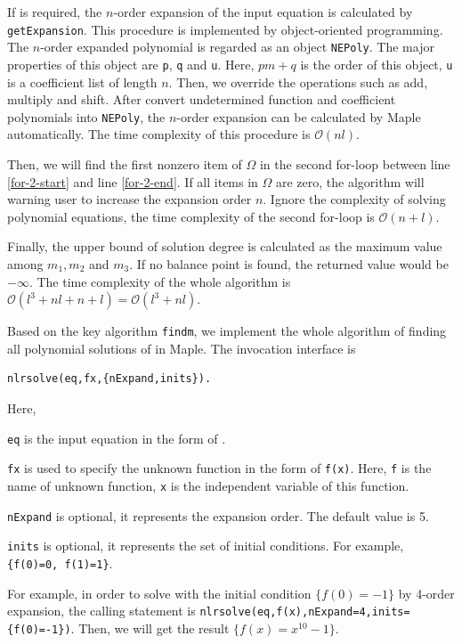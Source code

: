 If \BPthree{} is required, the $n$-order expansion of the input equation is calculated by \texttt{getExpansion}. This procedure is implemented by object-oriented programming. The $n$-order expanded polynomial is regarded as an object \texttt{NEPoly}. The major properties of this object are \texttt{p}, \texttt{q} and \texttt{u}. Here, $pm+q$ is the order of this object, \texttt{u} is a coefficient list of length $n$. Then, we override the operations such as add, multiply and shift. After convert undetermined function and coefficient polynomials into \texttt{NEPoly}, the $n$-order expansion can be calculated by Maple automatically. The time complexity of this procedure is $\mathcal O(nl)$.

Then, we will find the first nonzero item of $\Omega$ in the second for-loop between line \ref{for-2-start} and line \ref{for-2-end}. If all items in $\Omega$ are zero, the algorithm will warning user to increase the expansion order $n$. Ignore the complexity of solving polynomial equations, the time complexity of the second for-loop is $\mathcal O(n+l)$.

Finally, the upper bound of solution degree is calculated as the maximum value among $m_1,m_2$ and $m_3$. If no balance point is found, the returned value would be $-\infty$. The time complexity of the whole algorithm is $\mathcal O(l^3+nl+n+l)=\mathcal O(l^3+nl)$.

Based on the key algorithm \texttt{findm}, we implement the whole algorithm of finding all polynomial solutions of  in Maple. The invocation interface is
\begin{verbatim}
nlrsolve(eq,fx,{nExpand,inits}).
\end{verbatim}
Here,
\begin{compactitem}[\textbullet]
\item \texttt{eq} is the input equation in the form of .
\item \texttt{fx} is used to specify the unknown function in the form of \texttt{f(x)}. Here, \texttt{f} is the name of unknown function, \texttt{x} is the independent variable of this function.
\item \texttt{nExpand} is optional, it represents the expansion order. The default value is 5.
\item \texttt{inits} is optional, it represents the set of initial conditions. For example, \texttt{\{f(0)=0, f(1)=1\}}.
\end{compactitem}

For example, in order to solve  with the initial condition $\{f(0)=-1\}$ by 4-order expansion, the calling statement is \verb|nlrsolve(eq,f(x),nExpand=4,inits={f(0)=-1})|. Then, we will get the result $\{f(x)=x^{10}-1\}$.


